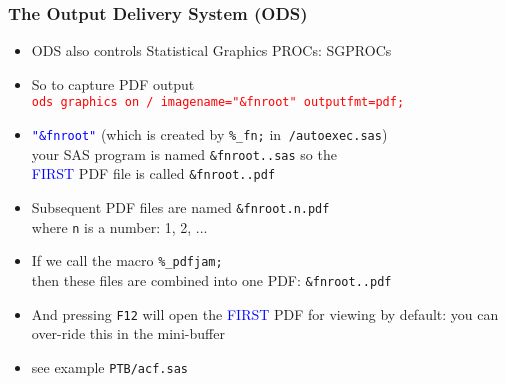 \documentclass[11pt,pdftex,dvipsnames,usenames,helvetica]{beamer}
\begin{document}
\begin{frame}[fragile]
\frametitle{The Output Delivery System (ODS)}
\begin{itemize}
\item ODS also controls Statistical Graphics PROCs: SGPROCs
\item So to capture PDF output\\
\textcolor{red}{\tt ods graphics on / imagename="\&fnroot" outputfmt=pdf;}
\item \textcolor{blue}{\tt "\&fnroot"} 
(which is created by {\tt \%\_fn;} in {\tt $~$/autoexec.sas})\\
your SAS program is named {\tt \&fnroot..sas}
so the\\ \textcolor{blue}{FIRST} PDF file is called {\tt \&fnroot..pdf}
\item Subsequent PDF files are named {\tt \&fnroot.n.pdf}\\
where {\tt n} is a number: 1, 2, ...
\item If we call the macro {\tt \%\_pdfjam;}\\ then these files
are combined into one PDF: {\tt \&fnroot..pdf}
\item And pressing {\tt F12} will open the \textcolor{blue}{FIRST} PDF
for viewing by default: you can over-ride this in the mini-buffer
\item see example {\tt PTB/acf.sas}
\end{itemize}

\end{frame}
\end{document}
